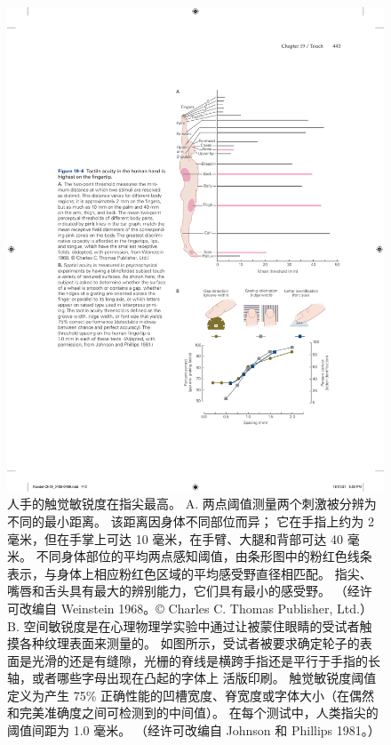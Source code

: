\begin{figure}[htbp]
	\centering
	\includegraphics[width=1.0\linewidth]{chap19/fig_19_6}
	\caption{人手的触觉敏锐度在指尖最高。 
		A. 两点阈值测量两个刺激被分辨为不同的最小距离。 该距离因身体不同部位而异； 它在手指上约为 2 毫米，但在手掌上可达 10 毫米，在手臂、大腿和背部可达 40 毫米。 
		不同身体部位的平均两点感知阈值，由条形图中的粉红色线条表示，与身体上相应粉红色区域的平均感受野直径相匹配。 
		指尖、嘴唇和舌头具有最大的辨别能力，它们具有最小的感受野。 （经许可改编自 Weinstein 1968。© Charles C. Thomas Publisher, Ltd.） 
		B. 空间敏锐度是在心理物理学实验中通过让被蒙住眼睛的受试者触摸各种纹理表面来测量的。 
		如图所示，受试者被要求确定轮子的表面是光滑的还是有缝隙，光栅的脊线是横跨手指还是平行于手指的长轴，或者哪些字母出现在凸起的字体上 活版印刷。 
		触觉敏锐度阈值定义为产生 75\% 正确性能的凹槽宽度、脊宽度或字体大小（在偶然和完美准确度之间可检测到的中间值）。 
		在每个测试中，人类指尖的阈值间距为 1.0 毫米。 （经许可改编自 Johnson 和 Phillips 1981。）}
	\label{fig:19_6}
\end{figure}



